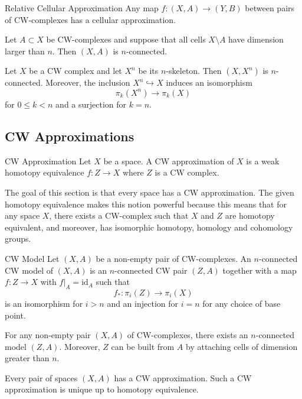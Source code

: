 \documentclass[a4paper]{article}
\begin{document}
\begin{thm}{Relative Cellular Approximation}{} Any map $f:(X,A)\to (Y,B)$ between pairs of CW-complexes has a cellular approximation. 
\end{thm}

\begin{crl}{}{} Let $A\subset X$ be CW-complexes and suppose that all cells $X\setminus A$ have dimension larger than $n$. Then $(X,A)$ is $n$-connected. 
\end{crl}

\begin{crl}{}{} Let $X$ be a CW complex and let $X^n$ be its $n$-skeleton. Then $(X,X^n)$ is $n$-connected. Moreover, the inclusion $X^n\hookrightarrow X$ induces an isomorphism $$\pi_k(X^n)\to\pi_k(X)$$ for $0\leq k<n$ and a surjection for $k=n$. 
\end{crl}

\subsection{CW Approximations}
\begin{defn}{CW Approximation}{} Let $X$ be a space. A CW approximation of $X$ is a weak homotopy equivalence $f:Z\to X$ where $Z$ is a CW complex. 
\end{defn}

The goal of this section is that every space has a CW approximation. The given homotopy equivalence makes this notion powerful because this means that for any space $X$, there exists a CW-complex such that $X$ and $Z$ are homotopy equivalent, and moreover, has isomorphic homotopy, homology and cohomology groups. 

\begin{defn}{CW Model}{} Let $(X,A)$ be a non-empty pair of CW-complexes. An $n$-connected CW model of $(X,A)$ is an $n$-connected CW pair $(Z,A)$ together with a map $f:Z\to X$ with $f|_A=\text{id}_A$ such that $$f_\ast:\pi_i(Z)\to\pi_i(X)$$ is an isomorphism for $i>n$ and an injection for $i=n$ for any choice of base point. 
\end{defn}

\begin{thm}{}{} For any non-empty pair $(X,A)$ of CW-complexes, there exists an $n$-connected model $(Z,A)$. Moreover, $Z$ can be built from $A$ by attaching cells of dimension greater than $n$. 
\end{thm}

\begin{thm}{}{} Every pair of spaces $(X,A)$ has a CW approximation. Such a CW approximation is unique up to homotopy equivalence. 
\end{thm}
\end{document}
